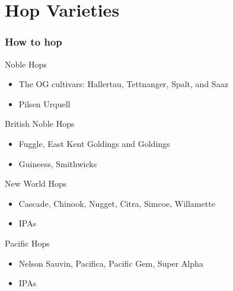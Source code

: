 \documentclass{beamer}
\begin{document}
\section{Hop Varieties}
\begin{frame}\frametitle{How to hop}
  Noble Hops
  \begin{itemize}
  \item The OG cultivars: Hallertau, Tettnanger, Spalt, and Saaz
  \item  Pilsen Urquell
  \end{itemize}
  British Noble Hops
  \begin{itemize}
  \item Fuggle, East Kent Goldings and Goldings
  \item Guineess, Smithwicks
  \end{itemize}
  New World Hops
  \begin{itemize}
  \item Cascade, Chinook, Nugget, Citra, Simcoe, Willamette
  \item IPAs
  \end{itemize}
  Pacific Hops
  \begin{itemize}
  \item Nelson Sauvin, Pacifica, Pacific Gem, Super Alpha
  \item IPAs
  \end{itemize}
\end{frame}

\end{document}
